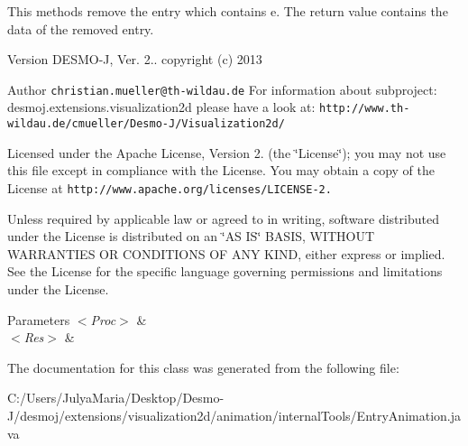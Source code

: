 This methods remove the entry which contains e. The return value contains the data of the removed entry.

\begin{DoxyVersion}{Version}
D\-E\-S\-M\-O-\/\-J, Ver. 2.. copyright (c) 2013 
\end{DoxyVersion}
\begin{DoxyAuthor}{Author}
{\tt christian.\-mueller@th-\/wildau.\-de} For information about subproject\-: desmoj.\-extensions.\-visualization2d please have a look at\-: {\tt http\-://www.\-th-\/wildau.\-de/cmueller/\-Desmo-\/\-J/\-Visualization2d/}
\end{DoxyAuthor}
Licensed under the Apache License, Version 2. (the \char`\"{}\-License\char`\"{}); you may not use this file except in compliance with the License. You may obtain a copy of the License at {\tt http\-://www.\-apache.\-org/licenses/\-L\-I\-C\-E\-N\-S\-E-\/2.}

Unless required by applicable law or agreed to in writing, software distributed under the License is distributed on an \char`\"{}\-A\-S I\-S\char`\"{} B\-A\-S\-I\-S, W\-I\-T\-H\-O\-U\-T W\-A\-R\-R\-A\-N\-T\-I\-E\-S O\-R C\-O\-N\-D\-I\-T\-I\-O\-N\-S O\-F A\-N\-Y K\-I\-N\-D, either express or implied. See the License for the specific language governing permissions and limitations under the License.


\begin{DoxyParams}{Parameters}
{\em $<$\-Proc$>$} & \\
\hline
{\em $<$\-Res$>$} & \\
\hline
\end{DoxyParams}


The documentation for this class was generated from the following file\-:\begin{DoxyCompactItemize}
\item 
C\-:/\-Users/\-Julya\-Maria/\-Desktop/\-Desmo-\/\-J/desmoj/extensions/visualization2d/animation/internal\-Tools/Entry\-Animation.\-java\end{DoxyCompactItemize}
